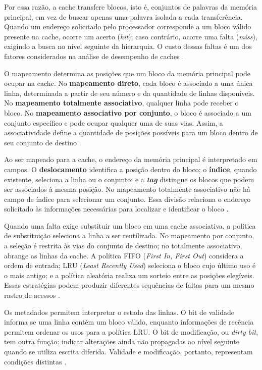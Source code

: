 \documentclass[article,12pt,oneside,a4paper,english,brazil]{abntex2}
\begin{document}
Por essa razão, a cache transfere blocos, isto é, conjuntos de palavras da memória principal, em vez de buscar apenas uma palavra isolada a cada transferência. Quando um endereço solicitado pelo processador corresponde a um bloco válido presente na cache, ocorre um acerto (\textit{hit}); caso contrário, ocorre uma falta (\textit{miss}), exigindo a busca no nível seguinte da hierarquia. O custo dessas faltas é um dos fatores considerados na análise de desempenho de caches \cite{sonia2021cache,barbhuiya2024cache}.

O mapeamento determina as posições que um bloco da memória principal pode ocupar na cache. No \textbf{mapeamento direto}, cada bloco é associado a uma única linha, determinada a partir de seu número e da quantidade de linhas disponíveis. No \textbf{mapeamento totalmente associativo}, qualquer linha pode receber o bloco. No \textbf{mapeamento associativo por conjunto}, o bloco é associado a um conjunto específico e pode ocupar qualquer uma de suas vias. Assim, a associatividade define a quantidade de posições possíveis para um bloco dentro de seu conjunto de destino \cite{patterson2014computer}.

Ao ser mapeado para a cache, o endereço da memória principal é interpretado em campos. O \textbf{deslocamento} identifica a posição dentro do bloco; o \textbf{índice}, quando existente, seleciona a linha ou o conjunto; e a \textbf{\textit{tag}} distingue os blocos que podem ser associados à mesma posição. No mapeamento totalmente associativo não há campo de índice para selecionar um conjunto. Essa divisão relaciona o endereço solicitado às informações necessárias para localizar e identificar o bloco \cite{patterson2014computer}.

Quando uma falta exige substituir um bloco em uma cache associativa, a política de substituição seleciona a linha a ser reutilizada. No mapeamento por conjunto, a seleção é restrita às vias do conjunto de destino; no totalmente associativo, abrange as linhas da cache. A política FIFO (\textit{First In, First Out}) considera a ordem de entrada; LRU (\textit{Least Recently Used}) seleciona o bloco cujo último uso é o mais antigo; e a política aleatória realiza um sorteio entre as posições elegíveis. Essas estratégias podem produzir diferentes sequências de faltas para um mesmo rastro de acessos \cite{kumar2016cache}.

Os metadados permitem interpretar o estado das linhas. O bit de validade informa se uma linha contém um bloco válido, enquanto informações de recência permitem ordenar os usos para a política LRU. O bit de modificação, ou \textit{dirty bit}, tem outra função: indicar alterações ainda não propagadas ao nível seguinte quando se utiliza escrita diferida. Validade e modificação, portanto, representam condições distintas \cite{patterson2014computer}.
\end{document}
